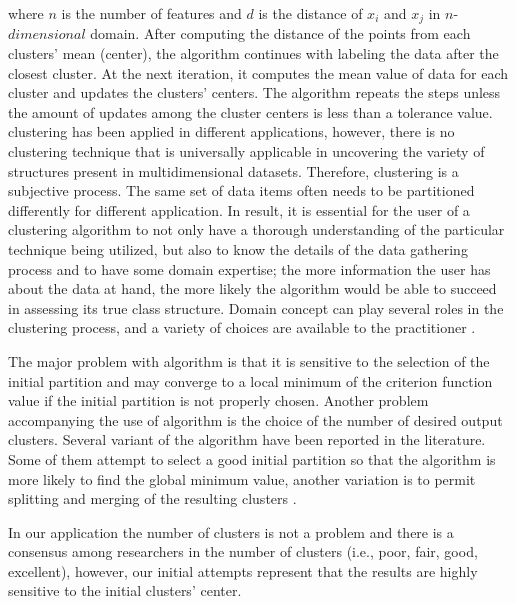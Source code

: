 where $n$ is the number of features and $d$ is the distance of $x_i$ and $x_j$ in $n$-$dimensional$ domain. After computing the distance of the points from each clusters' mean (center), the algorithm continues with labeling the data after the closest cluster. At the next iteration, it computes the mean value of data for each cluster and updates the clusters' centers. The algorithm repeats the steps unless the amount of updates among the cluster centers is less than a tolerance value.  \kmeans{} clustering has been applied in different applications, however, there is no clustering technique that is universally applicable in uncovering the variety of structures present in multidimensional datasets. Therefore, clustering is a subjective process. The same set of data items often needs to be partitioned differently for different application. In result, it is essential for the user of a clustering algorithm to not only have a thorough understanding of the particular technique being utilized, but also to know the details of the data gathering process and to have some domain expertise; the more information the user has about the data at hand, the more likely the algorithm would be able to succeed in assessing its true class structure. Domain concept can play several roles in the clustering process, and a variety of choices are available to the practitioner \citep{Jain_1999}. 

The major problem with \kmeans{} algorithm is that it is sensitive to the selection of the initial partition and may converge to a local minimum of the criterion function value if the initial partition is not properly chosen. Another problem accompanying the use of \kmeans{} algorithm is the choice of the number of desired output clusters. Several variant of the \kmeans{} algorithm have been reported in the literature. Some of them attempt to select a good initial partition so that the algorithm is more likely to find the global minimum value, another variation is to permit splitting and merging of the resulting clusters \citep{Jain_1999}. 

In our application the number of clusters is not a problem and there is a consensus among researchers in the number of clusters (i.e., poor, fair, good, excellent), however, our initial attempts represent that the results are highly sensitive to the initial clusters' center. 

